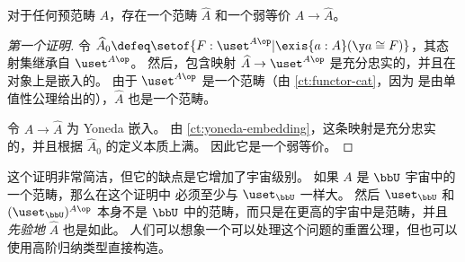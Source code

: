 %
%

\begin{thm}\label{thm:rezk-completion}
对于任何预范畴 $A$，存在一个范畴 $\widehat A$ 和一个弱等价 $A\to\widehat{A}$。
\end{thm}

\begin{proof}[第一个证明]
  令 $\widehat{A}_0 \defeq \setof{ F:\uset^{A\op} | \exis{a:A} (\y a \cong F)}$，其态射集继承自 $\uset^{A\op}$。
  然后，包含映射 $\widehat{A} \to \uset^{A\op}$ 是充分忠实的，并且在对象上是嵌入的。
  由于 $\uset^{A\op}$ 是一个范畴（由 \cref{ct:functor-cat}，因为 \uset 是由单值性公理给出的），$\widehat A$ 也是一个范畴。

  令 $A\to\widehat A$ 为 Yoneda 嵌入。
  由 \cref{ct:yoneda-embedding}，这条映射是充分忠实的，并且根据 $\widehat{A}_0$ 的定义本质上满。
  因此它是一个弱等价。
\end{proof}

这个证明非常简洁，但它的缺点是它增加了宇宙级别。
如果 $A$ 是 $\bbU$ 宇宙中的一个范畴，那么在这个证明中 \uset 必须至少与 $\uset_\bbU$ 一样大。
然后 $\uset_\bbU$ 和 $(\uset_\bbU)^{A\op}$ 本身不是 $\bbU$ 中的范畴，而只是在更高的宇宙中是范畴，并且\emph{先验地} $\widehat A$ 也是如此。
人们可以想象一个可以处理这个问题的重置公理，但也可以使用高阶归纳类型直接构造。

